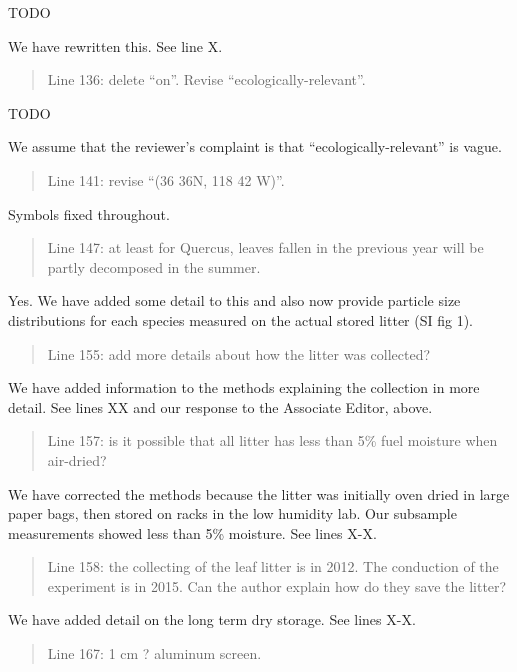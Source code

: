 \documentclass[letterpaper, 12pt]{letter}
\begin{document}
\begin{letter}{}
TODO

We have rewritten this. See line X.

\begin{quote}
Line 136: delete “on”. Revise “ecologically-relevant”.
\end{quote}

TODO

We assume that the reviewer's complaint is that ``ecologically-relevant'' is vague.

\begin{quote}
Line 141: revise “(36 36N, 118 42 W)”.
\end{quote}

Symbols fixed throughout.

\begin{quote}
Line 147: at least for Quercus, leaves fallen in the previous year will be partly decomposed in the summer.
\end{quote}

Yes. We have added some detail to this and also now provide particle size distributions for each species measured on the actual stored litter (SI fig 1).

\begin{quote}
Line 155: add more details about how the litter was collected?
\end{quote}

We have added information to the methods explaining the collection in more detail. See lines XX and our response to the Associate Editor, above. 

\begin{quote}
Line 157: is it possible that all litter has less than 5\% fuel moisture when air-dried?
\end{quote}

We have corrected the methods because the litter was initially oven dried in large paper bags, then stored on racks in the low humidity lab. Our subsample measurements showed less than 5\% moisture.  See lines X-X.

\begin{quote}
Line 158: the collecting of the leaf litter is in 2012. The conduction of the experiment is in 2015. Can the author explain how do they save the litter?
\end{quote}

We have added detail on the long term dry storage. See lines X-X.

\begin{quote}
Line 167: 1 cm ? aluminum screen.
\end{quote}


\end{letter}
\end{document}
